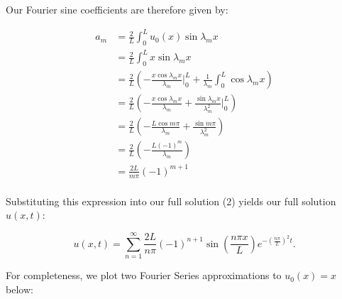 \begin{solution}
    Our Fourier sine coefficients are therefore given by:

    \begin{align*}
        a_m &= \frac{2}{L} \int_{0}^{L}{u_0(x) \sin{\lambda_m x}} \\
            &= \frac{2}{L} \int_{0}^{L}{x \sin{\lambda_m x}} \\
            &= \frac{2}{L} \left( -\frac{x \cos{\lambda_m x}}{\lambda_m} \bigg\rvert_{0}^{L} + \frac{1}{\lambda_m} \int_{0}^{L}{\cos{\lambda_m x}} \right) \\
            &= \frac{2}{L} \left( -\frac{x \cos{\lambda_m x}}{\lambda_m} + \frac{\sin{\lambda_m x}}{\lambda_m^2} \bigg\rvert_{0}^{L} \right) \\
            &= \frac{2}{L} \left( -\frac{L \cos{m \pi}}{\lambda_m} + \frac{\sin{m \pi}}{\lambda_m^2} \right) \\
            &= \frac{2}{L} \left( -\frac{L (-1)^m}{\lambda_m} \right) \\
            &= \frac{2 L}{m \pi} (-1)^{m+1} \\
    \end{align*}

    Substituting this expression into our full solution (2) yields our full solution $u(x, t)$:
    
    $$
    u(x, t) = \sum\limits_{n=1}^{\infty}{\frac{2 L}{n \pi} (-1)^{n+1} \sin\left(\frac{n \pi x}{L}\right)} e^{-\left(\frac{n \pi}{L}\right)^2 t}.
    $$

    For completeness, we plot two Fourier Series approximations to $u_0(x) = x$ below: \\


\end{solution}
